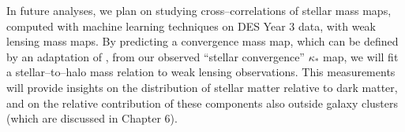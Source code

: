 In future analyses, we plan on studying cross--correlations of stellar mass maps, computed with machine learning techniques on DES Year 3 data, with weak lensing mass maps. By predicting a convergence mass map, which can be defined by an adaptation of \citet{2016ApJ...833..156U}, from our observed ``stellar convergence'' $\kappa_*$ map, we will fit a stellar--to--halo mass relation to weak lensing observations. This measurements will provide insights on the distribution of stellar matter relative to dark matter, and on the relative contribution of these components also outside galaxy clusters (which are discussed in Chapter 6).











